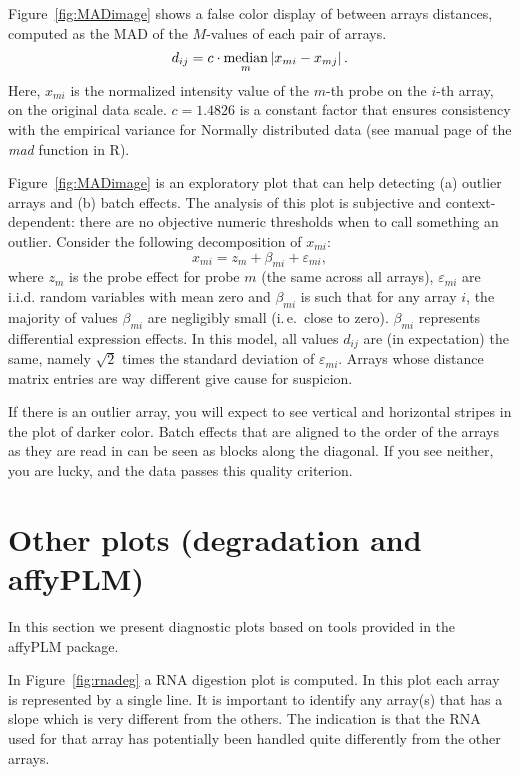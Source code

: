 \documentclass[11pt]{article}
\newcommand{\Rpackage}[1]{{\textsf{#1}}}
\begin{document}
Figure~\ref{fig:MADimage} shows a false color display of between arrays
distances, computed as the MAD of the $M$-values of each pair of
arrays.
\begin{equation*}
d_{ij} = c\cdot \displaystyle \operatornamewithlimits{median}_{m} 
  \left| x_{mi}- x_{mj}\right|.
\end{equation*}
Here, $x_{mi}$ is the normalized intensity value of the $m$-th probe
on the $i$-th array, on the original data scale. $c=1.4826$ is a constant factor
that ensures consistency with the empirical variance for Normally
distributed data (see manual page of the \textit{mad} function in R).
 
Figure~\ref{fig:MADimage} is an exploratory plot that can 
help detecting (a) outlier arrays and (b) batch effects. The analysis 
of this plot is subjective and context-dependent: there are no
objective numeric thresholds when to call something an outlier.
Consider the following decomposition of $x_{mi}$:
\begin{equation}
x_{mi}= z_m + \beta_{mi} + \varepsilon_{mi},
\end{equation}
where $z_m$ is the probe effect for probe $m$ (the same across all
arrays), $\varepsilon_{mi}$ are i.i.d. random variables with mean zero
and $\beta_{mi}$ is such that for any array $i$, the majority of values
$\beta_{mi}$ are negligibly small (i.\,e.\ close to zero).
$\beta_{mi}$ represents differential expression effects.  In this
model, all values $d_{ij}$ are (in expectation) the same, namely
$\sqrt{2}$ times the standard deviation of $\varepsilon_{mi}$.  Arrays
whose distance matrix entries are way different give cause for
suspicion.

If there is an outlier array, you will expect to see vertical and horizontal
stripes in the plot of darker color. Batch effects that are aligned to
the order of the arrays as they are read in can be seen as blocks
along the diagonal. If you see neither, you are lucky, and the data
passes this quality criterion.

\section{Other plots (degradation and affyPLM)}

In this section we present diagnostic plots based on tools provided
in the \Rpackage{affyPLM} package.

In Figure~\ref{fig:rnadeg} a RNA digestion plot is computed. In this plot
each array is represented by a single line. It is important to identify 
any array(s) that has a slope which is very different from the others. 
The indication is that the RNA used for that array has potentially 
been handled quite differently from the other arrays. 
\end{document}
